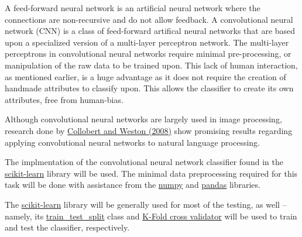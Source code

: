 \documentclass[12pt, letterpaper]{article}
\begin{document}
A feed-forward neural network is an artificial neural network where the
connections are non-recursive and do not allow feedback. A convolutional
neural network (CNN) is a class of feed-forward artifical neural networks that
are based upon a specialized version of a multi-layer perceptron network.
The multi-layer perceptrons in convolutional neural networks require minimal
pre-processing, or manipulation of the raw data to be trained upon. This lack of
human interaction, as mentioned earlier, is a huge advantage as it does not
require the creation of handmade attributes to classify upon. This allows the
classifier to create its own attributes, free from human-bias.

Although convolutional neural networks are largely used in image processing,
research done by \href{https://dl.acm.org/citation.cfm?doid=1390156.1390177}
{Collobert and Weston (2008)} show promising results
regarding applying convolutional neural networks to natural language
processing.

The implmentation of the convolutional neural network classifier found in
the \href{https://scikit-learn.org/stable/index.html}{scikit-learn}
library will be used. The minimal data preprocessing required for this
task will be done with assistance from the \href{http://www.numpy.org/}{numpy}
and \href{https://pandas.pydata.org/}{pandas} libraries.

The
\href{https://scikit-learn.org/stable/index.html}{scikit-learn} library
will be generally used for most of the testing, as well -- namely, its
\href{https://scikit-learn.org/stable/modules/generated/sklearn.model_selection.
train_test_split.html}{train\_test\_split} class and
\href{https://scikit-learn.org/stable/modules/generated/sklearn.model_selection.KFold.html}
{K-Fold cross validator} will be used to train and test the classifier,
respectively.
\end{document}
